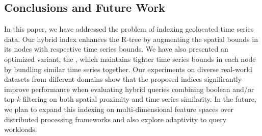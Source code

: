 \subsection{Conclusions and Future Work}
\label{sec:conclusions}

In this paper, we have addressed the problem of indexing geolocated time series data. Our hybrid \tsr index enhances the R-tree by augmenting the spatial bounds in its nodes with respective time series bounds. We have also presented an optimized variant, the \ctsr, which maintains tighter time series bounds in each node by bundling similar time series together. Our experiments on diverse real-world datasets from different domains show that the proposed indices significantly improve performance when evaluating hybrid queries combining boolean and/or top-$k$ filtering on both spatial proximity and time series similarity. In the future, we plan to expand this indexing on multi-dimensional feature spaces over distributed processing frameworks and also explore adaptivity to query workloads. 